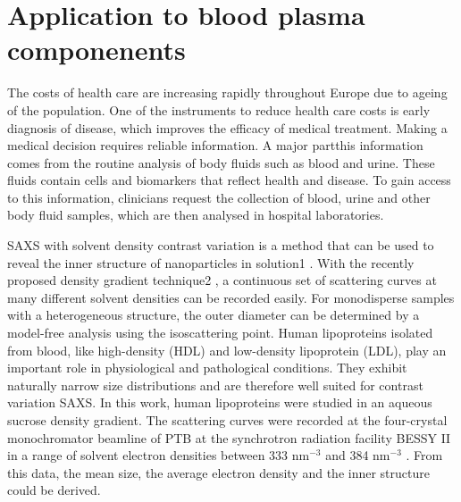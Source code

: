 



\section{Application to blood plasma componenents}

The costs of health care are increasing rapidly throughout Europe due to ageing of the population. One of the instruments to reduce health care costs is early diagnosis of disease, which improves the efficacy of medical treatment. Making a medical decision requires reliable information. A major partthis information comes from the routine analysis of body fluids such as blood and urine. These fluids contain cells and biomarkers that reflect health and disease. To gain access to this information, clinicians request the collection of blood, urine and other body fluid samples, which are then analysed in hospital laboratories.


SAXS with solvent density contrast variation is a method that can be used to reveal the inner structure of nanoparticles in solution1 . With the recently proposed density gradient technique2 , a continuous set of scattering curves at many different solvent densities can be recorded easily. For monodisperse samples with a heterogeneous structure, the outer diameter can be determined by a model-free analysis using the isoscattering point. Human lipoproteins isolated from blood, like high-density (HDL) and low-density lipoprotein (LDL), play an important role in physiological and pathological conditions. They exhibit naturally narrow size distributions and are therefore well suited for contrast variation SAXS. In this work, human lipoproteins were studied in an aqueous sucrose density gradient. The scattering curves were recorded at the four-crystal monochromator beamline of PTB at the synchrotron radiation facility BESSY II in a range of solvent electron densities between 333 nm$^{-3}$ and 384 nm$^{-3}$ . From this data, the mean size, the average electron density and the inner structure could be derived.



